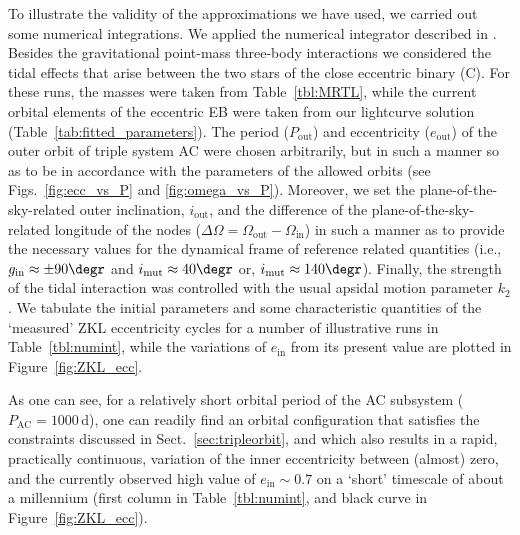 \documentclass[fleqn,usenatbib]{mnras} %
\begin{document}
To illustrate the validity of the approximations we have used, we carried out some numerical integrations. We applied the numerical integrator described in \citet{Borkovits2004}. Besides the gravitational point-mass three-body interactions we considered the tidal effects that arise between the two stars of the close eccentric binary (C). For these runs, the masses were taken from Table~\ref{tbl:MRTL}, while the current orbital elements of the eccentric EB were taken from our lightcurve solution (Table~\ref{tab:fitted_parameters}). The period ($P_\mathrm{out}$) and eccentricity ($e_\mathrm{out}$) of the outer  orbit of triple system AC were chosen arbitrarily, but in such a manner so as to be in accordance with the parameters of the allowed orbits (see Figs.~\ref{fig:ecc_vs_P} and \ref{fig:omega_vs_P}). Moreover, we set the plane-of-the-sky-related outer inclination, $i_\mathrm{out}$, and the difference of the plane-of-the-sky-related longitude of the nodes ($\Delta\Omega=\Omega_\mathrm{out}-\Omega_\mathrm{in}$) in such a manner as to provide the necessary values for the dynamical frame of reference related quantities (i.e., $g_\mathrm{in}\approx\pm90\degr$ and $i_\mathrm{mut}\approx40\degr$ or, $i_\mathrm{mut}\approx140\degr$).  Finally, the strength of the tidal interaction was controlled with the usual apsidal motion parameter $k_2$. We tabulate the initial parameters and some characteristic quantities of the `measured' ZKL eccentricity cycles for a number of illustrative runs in Table~\ref{tbl:numint}, while the variations of $e_\mathrm{in}$ from its present value are plotted in Figure~\ref{fig:ZKL_ecc}.

As one can see, for a relatively short orbital period of the AC subsystem ($P_\mathrm{AC}=1000$\,d), one can readily find an orbital configuration that satisfies the constraints discussed in Sect.~\ref{sec:tripleorbit}, and which also results in a rapid, practically continuous, variation of the inner eccentricity between (almost) zero, and the currently observed high value of $e_\mathrm{in}\sim0.7$ on a `short' timescale of about a millennium (first column in Table~\ref{tbl:numint}, and black curve in Figure~\ref{fig:ZKL_ecc}).
\end{document}
